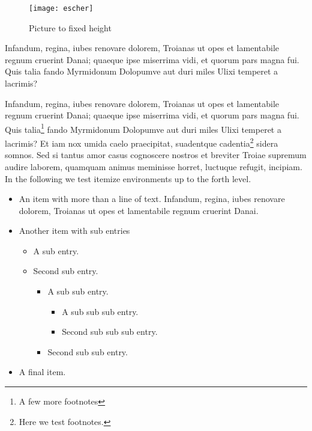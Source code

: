 \documentclass[
    ,final            %
  ]
  {aipproc}
\begin{document}

\begin{figure}
  \texttt{[image: escher]}
  \caption{Picture to fixed height}
\end{figure}

Infandum, regina, iubes renovare dolorem, Troianas ut opes et
lamentabile regnum cruerint Danai; quaeque ipse miserrima vidi, et
quorum pars magna fui. Quis talia fando Myrmidonum Dolopumve aut duri
miles Ulixi temperet a lacrimis?

Infandum, regina, iubes renovare dolorem, Troianas ut opes et
lamentabile regnum cruerint Danai; quaeque ipse miserrima vidi, et
quorum pars magna fui. Quis talia\footnote{A few more footnotes} fando
Myrmidonum Dolopumve aut duri miles Ulixi temperet a lacrimis? Et iam
nox umida caelo praecipitat, suadentque cadentia\footnote{Here we test
footnotes.} sidera somnos. Sed si tantus amor casus cognoscere nostros
et breviter Troiae supremum audire laborem, quamquam animus meminisse
horret, luctuque refugit, incipiam.
In the following we test itemize environments up to the forth level.
\begin{itemize}
\item
  An item with more than a line of text. Infandum, regina, iubes
  renovare dolorem, Troianas ut opes et lamentabile regnum cruerint
  Danai.
\item
  Another item with sub entries
  \begin{itemize}
  \item
   A sub entry.
  \item
   Second sub entry.
    \begin{itemize}
    \item
     A sub sub entry.
      \begin{itemize}
      \item
       A sub sub sub entry.
      \item
       Second sub sub sub entry.
      \end{itemize}
    \item
     Second sub sub entry.
    \end{itemize}
  \end{itemize}
\item
  A final item.
\end{itemize}
\end{document}

